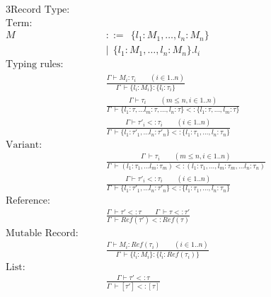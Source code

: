 \begin{alignat}{3}
\text{Record Type:} \qquad   \nonumber\\
  \text{Term:} \qquad   \nonumber\\
                        M~ & {::= ~~ \{l_1:M_1,\dots,l_n:M_n \}}\\
                           & | ~~\{l_1:M_1,\dots,l_n:M_n \}.l_i\\
  \text{Typing rules:} \qquad   \nonumber\\
  & \frac{\Gamma \vdash M_i:\tau_i \qquad(i \in 1..n)}
         {\Gamma ~ \vdash \{l_i: M_i\}: \{l_i : \tau_i\} }\\
  & \frac{\Gamma \vdash \tau_i \qquad(m \leq n, i \in 1..n)}
       {\Gamma ~ \vdash \{l_1: \tau,\dots l_m : \tau, \dots, l_n : \tau\}  <: \{l_1: \tau,\dots, l_m : \tau\}}\\
  & \frac{\Gamma \vdash \tau'_i <: \tau_i  \qquad(i \in 1..n)}
       {\Gamma ~ \vdash \{l_1: \tau'_1,\dots l_n : \tau'_n \}  <: \{l_1: \tau_1,\dots, l_n : \tau_n\}}\\
\text{Variant:} \qquad   \nonumber\\
  &   \frac{\Gamma~ \vdash \tau_i  \qquad(m \leq n, i \in 1..n)}
       {\Gamma~ \vdash (l_1:\tau_1,\dots l_m:\tau_m) <: (l_1:\tau_1,\dots, l_m:\tau_m,\dots l_n:\tau_n)}\\
  & \frac{\Gamma \vdash \tau'_i <: \tau_i  \qquad(i \in 1..n)}
       {\Gamma ~ \vdash \{l_1: \tau'_1,\dots l_n : \tau'_n \}  <: \{l_1: \tau_1,\dots, l_n : \tau_n\}}\\
\text{Reference:} \qquad   \nonumber\\
  & \frac{\Gamma ~ \vdash \tau' <: \tau \qquad \Gamma ~ \vdash \tau <: \tau'}
         {\Gamma ~ \vdash Ref(\tau') <: Ref(\tau)}\\
\text{Mutable Record:} \qquad   \nonumber\\
  & \frac{\Gamma \vdash M_i:Ref(\tau_i) \qquad  (i \in 1..n)}
       {\Gamma ~ \vdash \{l_i: M_i\}: \{l_i : Ref(\tau_i)\} }\\
\text{List:} \qquad   \nonumber\\
  & \frac{\Gamma \vdash \tau' <: \tau}
       {\Gamma ~ \vdash [\tau'] <: [\tau]}
\end{alignat}

